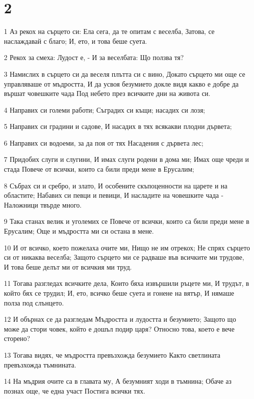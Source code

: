 \chapter{2}

\par 1 Аз рекох на сърцето си: Ела сега, да те опитам с веселба, Затова, се наслаждавай с благо; И, ето, и това беше суета.
\par 2 Рекох за смеха: Лудост е, - И за веселбата: Що ползва тя?
\par 3 Намислих в сърцето си да веселя плътта си с вино, Докато сърцето ми още се управляваше от мъдростта, И да усвоя безумието докле видя какво е добре да вършат човешките чада Под небето през всичките дни на живота си.
\par 4 Направих си големи работи; Съградих си къщи; насадих си лозя;
\par 5 Направих си градини и садове, И насадих в тях всякакви плодни дървета;
\par 6 Направих си водоеми, за да поя от тях Насадения с дървета лес;
\par 7 Придобих слуги и слугини, И имах слуги родени в дома ми; Имах още чреди и стада Повече от всички, които са били преди мене в Ерусалим;
\par 8 Събрах си и сребро, и злато, И особените скъпоценности на царете и на областите; Набавих си певци и певици, И насладите на човешките чада - Наложници твърде много.
\par 9 Така станах велик и уголемих се Повече от всички, които са били преди мене в Ерусалим; Още и мъдростта ми си остана в мене.
\par 10 И от всичко, което пожелаха очите ми, Нищо не им отрекох; Не спрях сърцето си от никаква веселба; Защото сърцето ми се радваше във всичките ми трудове, И това беше делът ми от всичкия ми труд.
\par 11 Тогава разгледах всичките дела, Които бяха извършили ръцете ми, И трудът, в който бях се трудил; И, ето, всичко беше суета и  гонене на вятър, И нямаше полза под слънцето.
\par 12 И обърнах се да разгледам Мъдростта и лудостта и безумието; Защото що може да стори човек, който е дошъл подир царя? Относно това, което е вече сторено?
\par 13 Тогава видях, че мъдростта превъзхожда безумието Както светлината превъзхожда тъмнината.
\par 14 На мъдрия очите са в главата му, А безумният ходи в тъмнина; Обаче аз познах още, че една участ Постига всички тях.
